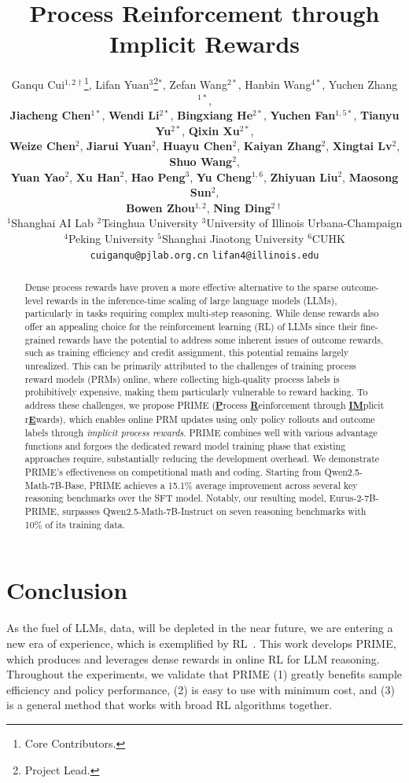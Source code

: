 \documentclass{article} %
\title{Process Reinforcement through Implicit Rewards}
\author{Ganqu Cui$^{1,2\dagger}$\thanks{Core Contributors.}, Lifan Yuan$^{3}$\thanks{Project Lead.}\hspace{0.35em}$^{*}$, Zefan Wang$^{2*}$, Hanbin Wang$^{4*}$, Yuchen Zhang$^{1*}$, \\ \textbf{Jiacheng Chen$^{1*}$}, \textbf{Wendi Li$^{2*}$}, \textbf{Bingxiang He}$^{2*}$,
\textbf{Yuchen Fan$^{1,5*}$}, \textbf{Tianyu Yu$^{2*}$}, \textbf{Qixin Xu$^{2*}$}, \\\textbf{Weize Chen$^{2}$}, \textbf{Jiarui Yuan}$^{2}$,  \textbf{Huayu Chen}$^{2}$, \textbf{Kaiyan Zhang}$^{2}$, \textbf{Xingtai Lv}$^{2}$, \textbf{Shuo Wang}$^{2}$, \\\textbf{Yuan Yao}$^{2}$, \textbf{Xu Han}$^{2}$,  \textbf{Hao Peng}$^{3}$, 
\textbf{Yu Cheng}$^{1,6}$, \textbf{Zhiyuan Liu}$^{2}$, \textbf{Maosong Sun}$^{2}$, \\\textbf{Bowen Zhou}$^{1,2}$, \textbf{Ning Ding}$^{2\dagger}$\\
$^1$Shanghai AI Lab \quad
$^2$Tsinghua University \quad
$^3$University of Illinois Urbana-Champaign \hfill\\
$^4$Peking University \quad
$^5$Shanghai Jiaotong University \quad
$^6$CUHK
\\
\texttt{cuiganqu@pjlab.org.cn} \quad
\texttt{lifan4@illinois.edu}
}
\begin{document}
\maketitle

\begin{abstract}
Dense process rewards have proven a more effective alternative to the sparse outcome-level rewards in the inference-time scaling of large language models (LLMs), particularly in tasks requiring complex multi-step reasoning. 
While dense rewards also offer an appealing choice for the reinforcement learning (RL) of LLMs since their fine-grained rewards have the potential to address some inherent issues of outcome rewards, such as training efficiency and credit assignment, this potential remains largely unrealized. This can be primarily attributed to the challenges of 
training process reward models (PRMs) online, where collecting high-quality process labels is prohibitively expensive, making them particularly vulnerable to reward hacking.
To address these challenges, we propose PRIME (\underline{\textbf{P}}rocess \underline{\textbf{R}}einforcement through \underline{\textbf{IM}}plicit r\underline{\textbf{E}}wards), which enables online PRM updates using only policy rollouts and outcome labels through \textit{implicit process rewards}. 
PRIME combines well with various advantage functions and forgoes the dedicated reward model training phase that existing approaches require, substantially reducing the development overhead. 
We demonstrate PRIME's effectiveness on competitional math and coding. Starting from Qwen2.5-Math-7B-Base, PRIME achieves a 15.1\% average improvement across several key reasoning benchmarks over the SFT model. Notably, our resulting model, Eurus-2-7B-PRIME, surpasses Qwen2.5-Math-7B-Instruct on seven reasoning benchmarks with 10\% of its training data.%
\end{abstract}







% 

\vspace{-10pt}
\section{Conclusion}
As the fuel of LLMs, data, will be depleted in the near future, we are entering a new era of experience, which is exemplified by RL~\citep{sutton2019bitter}. This work develops PRIME, which produces and leverages dense rewards in online RL for LLM reasoning. Throughout the experiments, we validate that PRIME (1) greatly benefits sample efficiency and policy performance, (2) is easy to use with minimum cost, and (3) is a general method that works with broad RL algorithms together.
\end{document}
